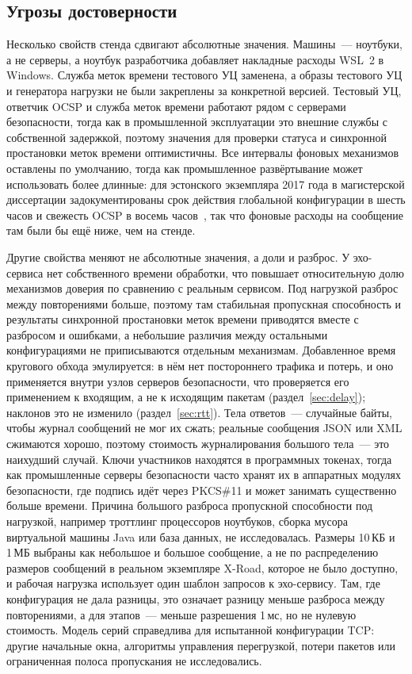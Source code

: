 \documentclass[conference,a4paper]{IEEEtran}
\newcommand{\newtext}[1]{{\color{blue}#1}}
\newcommand{\newred}[1]{{\color{red}#1}}
\begin{document}
\subsection{\newtext{Угрозы достоверности}}\label{sec:threats}

Несколько свойств стенда сдвигают абсолютные значения. Машины~--- ноутбуки, а не
серверы, а ноутбук разработчика добавляет накладные расходы WSL~2 в Windows. Служба меток времени
тестового УЦ заменена, а образы тестового УЦ и генератора нагрузки не были закреплены
за конкретной версией. Тестовый УЦ, ответчик OCSP
и служба меток времени работают рядом с серверами безопасности, тогда как в промышленной эксплуатации это
внешние службы с собственной задержкой, поэтому значения для проверки статуса и синхронной
простановки меток времени оптимистичны. Все интервалы фоновых механизмов оставлены по умолчанию,
тогда как промышленное развёртывание может использовать более длинные: для эстонского экземпляра 2017 года в магистерской
диссертации задокументированы срок действия глобальной конфигурации в шесть часов и свежесть OCSP в восемь
часов~\cite{mironova2017}, так что фоновые расходы на сообщение там были бы ещё ниже, чем на
стенде.

Другие свойства меняют не абсолютные значения, а доли и разброс. У эхо-сервиса
нет собственного времени обработки, что повышает относительную долю механизмов доверия по сравнению
с реальным сервисом. Под нагрузкой разброс между повторениями больше, поэтому там стабильная
пропускная способность и результаты синхронной простановки меток времени приводятся вместе с разбросом и
ошибками, а небольшие различия между остальными конфигурациями не приписываются отдельным
механизмам. Добавленное время кругового обхода эмулируется:
в нём нет постороннего трафика и потерь, и оно применяется внутри узлов серверов
безопасности\newtext{, что проверяется его применением к входящим, а не к исходящим пакетам
(раздел~\ref{sec:delay})}\newtext{; наклонов это не изменило (раздел~\ref{sec:rtt})}.
\newtext{Тела ответов~--- случайные байты, чтобы журнал сообщений не мог их сжать; реальные
сообщения JSON или XML сжимаются хорошо, поэтому стоимость журналирования большого тела~--- это наихудший случай. Ключи
участников находятся в программных токенах, тогда как промышленные серверы безопасности часто хранят их в аппаратных
модулях безопасности, где подпись идёт через PKCS\#11 и может занимать существенно больше времени. Причина
большого разброса пропускной способности под нагрузкой, например троттлинг процессоров ноутбуков, сборка мусора
виртуальной машины Java или база данных, не исследовалась.} \newred{Размеры 10\,КБ и
1\,МБ выбраны как небольшое и большое сообщение, а не по распределению размеров сообщений в реальном
экземпляре X-Road, которое не было доступно, и рабочая нагрузка использует один шаблон запросов к
эхо-сервису. Там, где конфигурация не дала разницы, это означает разницу меньше разброса между
повторениями, а для этапов~--- меньше разрешения 1\,мс, но не нулевую стоимость. Модель
серий справедлива для испытанной конфигурации TCP: другие начальные окна, алгоритмы управления перегрузкой,
потери пакетов или ограниченная полоса пропускания не исследовались.}
\end{document}
